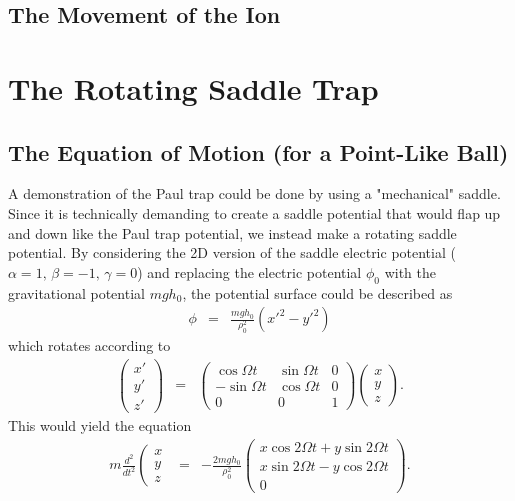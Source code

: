 \documentclass{article}
\begin{document}
\subsection{The Movement of the Ion}




\section{The Rotating Saddle Trap}

\subsection{The Equation of Motion (for a Point-Like Ball)}
A demonstration of the Paul trap could be done by using a "mechanical" saddle. Since it is technically demanding to create a saddle potential that would flap up and down like the Paul trap potential, we instead make a rotating saddle potential. By considering the 2D version of the saddle electric potential ($\alpha = 1,\, \beta = -1,\, \gamma = 0$) and replacing the electric potential $\phi_0$ with the gravitational potential $mgh_0$, the potential surface could be described as
\begin{eqnarray*}
\phi & = & \frac{mgh_0}{\rho_0^2} \left( {x'}^2 - {y'}^2 \right)
\end{eqnarray*}
which rotates according to 
\begin{eqnarray*}
\left(
\begin{array}{c}
	x' \\
	y' \\
	z'
\end{array} \right) & = & \left(
\begin{array}{c}
	\cos{\Omega t} & \sin{\Omega t} & 0 \\
	-\sin{\Omega t} & \cos{\Omega t} & 0 \\
	0 & 0 & 1
\end{array} \right) \left(
\begin{array}{c}
	x \\
	y \\
	z
\end{array} \right).
\end{eqnarray*}
This would yield the equation
\begin{eqnarray*}
m \frac{d^2}{dt^2} \left(
\begin{array}{c}
	x \\
	y \\
	z
\end{array} & = & -\frac{2mgh_0}{\rho_0^2} \left(
\begin{array}{c}
	x \cos{2\Omega t} + y \sin{2\Omega t} \\
	x \sin{2\Omega t} - y \cos{2\Omega t} \\
	0
\end{array} \right).
\end{eqnarray*}
\end{document}
